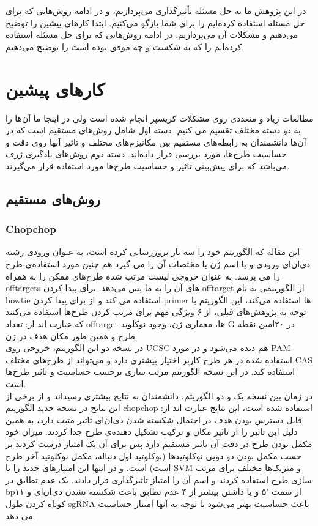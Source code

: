 \documentclass[12pt,a4paper,BCOR=.7cm,headsepline,bibliography=totoc]{report}
\begin{document}
در این پژوهش ما به حل مسئله تأثیرگذاری می‌پردازیم، و در ادامه روش‌هایی که برای حل مسئله استفاده کرده‌ایم را برای شما بازگو می‌کنیم. ابتدا کار‌های پیشین را توضیح می‌دهیم و مشکلات آن می‌پردازیم. در ادامه روش‌هایی که برای حل مسئله استفاده کرده‌ایم را که به شکست و چه موفق بوده است را توضیح می‌دهیم.

\chapter{کارهای پیشین}
مطالعات زیاد و متعددی روی مشکلات کریسپر انجام شده است ولی در اینجا ما آن‌ها را به دو دسته مختلف تقسیم می کنیم. دسته اول شامل روش‌های مستقیم است که در آن‌ها دانشمندان به رابطه‌های مستقیم بین مکانیزم‌های مختلف و تاثیر آنها روی دقت و حساسیت طرح‌ها، مورد بررسی قرار داده‌اند. دسته دوم روش‌های یادگیری ژرف می‌باشد که برای پیش‌بینی تاثیر و حساسیت طرح‌ها مورد استفاده قرار می‌گیرند.
\section{روش‌های مستقیم}
\subsection{Chopchop ~\cite{CHOPCHOP3,CHOPCHOP2,CHOPCHOP}}
این مقاله که الگوریتم خود را سه بار بروزرسانی کرده است، به عنوان ورودی رشته دی‌ان‌ای ورودی و یا اسم ژن یا مختصات آن را می گیرد هم چنین مورد استفاده‌ی طرح را می پرسد. به عنوان خروجی لیست مرتب شده طرح‌های ممکن را به همراه offtargets های آن را به ما پس می‌دهد. برای پیدا کردن offtarget از الگوریتمی به نام bowtie استفاده می کند و از  برای پیدا کردن primer ها استفاده می‌کند، این الگوریتم با توجه به پژوهش‌های قبلی، از ۶ ویژگی مهم برای مرتب کردن طرح‌ها استفاده می‌کنند که عبارت اند از: تعداد offtarget ها، معماری ژن،  وجود نوکلوید G در ۲۰امین نقطه طرح و همین طور مکان هدف در ژن. \\
در نسخه دو این الگوریتم، خروجی روی UCSC هم دیده می‌شود و در مورد PAM استفاده شده در هر طرح کاربر اختیار بیشتری دارد و می‌تواند از طرح‌های مختلف CAS استفاده کند. در این نسخه الگوریتم مرتب سازی برحسب حساسیت و تاثیر طرح‌ها است.\\
در زمان بین نسخه یک و دو الگوریتم، دانشمندان به نتایج بیشتری رسیداند و از برخی از این نتایج در نسخه جدید الگوریتم chopchop استفاده شده است، این نتایج عبارت اند از: قابل دسترس بودن هدف در احتمال شکسته شدن دی‌ان‌ای تاثیر مثبت دارد، به همین دلیل این تاثیر را از تاثیر مکان و ترکیب تشکیل دهنده‌ی طرح جدا کردند.
میزان خود مکمل بودن طرح در دقت آن تاثیر مستقیم دارد پس برای آن یک امتیاز درست کردند بر حسب مکمل بودن دو دویی نوکلوتید‌ها (نوکلوتید اول دنباله، مکمل نوکلوتید آخر طرح است) است. و در انتها این امتیاز‌های جدید را با SVM و متریک‌ها مختلف برای مرتب سازی طرح استفاده کردند و اسم آن را امتیاز تاثیرگذاری قرار دادند.
یک عدم تطابق در bp۱۱ از سمت ‍'۵ و یا داشتن بیشتر از ۴ عدم تطابق باعث شکسته نشدن دی‌ان‌ای و کوتاه کردن طول sgRNA باعث حساسیت بهتر می‌شود با توجه به آنها امیتاز حساسیت می دهد.
\end{document}
